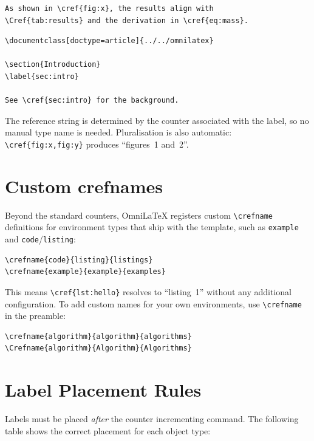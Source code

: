 \begin{verbatim}
As shown in \cref{fig:x}, the results align with
\Cref{tab:results} and the derivation in \cref{eq:mass}.
\end{verbatim}

\begin{verbatim}
\documentclass[doctype=article]{../../omnilatex}

\section{Introduction}
\label{sec:intro}

See \cref{sec:intro} for the background.

\end{verbatim}

The reference string is determined by the counter associated with the
label, so no manual type name is needed.  Pluralisation is also
automatic: \verb|\cref{fig:x,fig:y}| produces ``figures~1 and~2''.

\section{Custom crefnames}

Beyond the standard counters, OmniLaTeX registers custom
\verb|\crefname| definitions for environment types that ship with the
template, such as \texttt{example} and \texttt{code}/\texttt{listing}:

\begin{verbatim}
\crefname{code}{listing}{listings}
\crefname{example}{example}{examples}
\end{verbatim}

This means \verb|\cref{lst:hello}| resolves to ``listing~1'' without any
additional configuration.  To add custom names for your own environments,
use \verb|\crefname| in the preamble:

\begin{verbatim}
\crefname{algorithm}{algorithm}{algorithms}
\Crefname{algorithm}{Algorithm}{Algorithms}
\end{verbatim}

\section{Label Placement Rules}

Labels must be placed \emph{after} the counter incrementing command.
The following table shows the correct placement for each object type:

